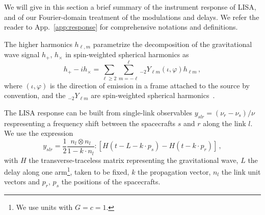\documentclass[aps,showpacs,twocolumn,prd,superscriptaddress,nofootinbib]{revtex4-1}
\newcommand{\be}{\begin{equation}}
\newcommand{\ee}{\end{equation}}
\begin{document}
We will give in this section a brief summary of the instrument response of LISA, and of our Fourier-domain treatment of the modulations and delays. We refer the reader to App.~\ref{app:response} for comprehensive notations and definitions.

The higher harmonics $h_{\ell, m}$ parametrize the decomposition of the gravitational wave signal $h_{+}$, $h_{\times}$ in spin-weighted spherical harmonics as
\be\label{eq:hpcmodes}
	h_{+} - i h_{\times} = \sum_{\ell \geq 2} \sum_{m = -\ell}^{\ell} {}_{-2}Y_{\ell m} (\iota, \varphi) h_{\ell m} \,,
\ee
where $(\iota, \varphi)$ is the direction of emission in a frame attached to the source by convention, and the ${}_{-2}Y_{\ell m}$ are spin-weighted spherical harmonics~\cite{}.

The LISA response can be built from single-link observables $y_{slr} = (\nu_{r} - \nu_{s})/\nu$ respresenting a frequency shift between the spacecrafts $s$ and $r$ along the link $l$. We use the expression~\cite{}
\be\label{eq:defyslr}
	y_{slr} = \frac{1}{2} \frac{n_{l} \otimes n_{l}}{1 - k\cdot n_{l}} : \left[ H(t - L - k\cdot p_{s}) - H(t - k\cdot p_{r}) \right] \,,
\ee
with $H$ the transverse-traceless matrix representing the gravitational wave, $L$ the delay along one arm\footnote{We use units with $G=c=1$.}, taken to be fixed, $k$ the propagation vector, $n_{l}$ the link unit vectors and $p_{r}$, $p_{s}$ the positions of the spacecrafts.
\end{document}
